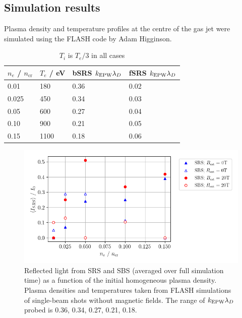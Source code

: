 \subsection{Simulation results}

Plasma density and temperature profiles at the centre of the gas jet were simulated using the FLASH code by Adam Higginson. 

\begin{table}[h]
\begin{center}

\begin{tabular}{|l|l|l|l|}
\hline
$n_e$ / $n_{\mathrm{cr}}$ & $T_e$ / eV & bSRS $k_\mathrm{EPW}\lambda_D$ & fSRS $k_\mathrm{EPW}\lambda_D$\\ \hline \hline
0.01 & 180 & 0.36 & 0.02 \\ \hline
0.025& 450 & 0.34 & 0.03 \\ \hline
0.05 & 600 & 0.27 & 0.04 \\ \hline
0.10 & 900 & 0.21 &  0.05\\ \hline
0.15 & 1100 & 0.18 & 0.06 \\ \hline

\end{tabular}

\end{center}
\caption{$T_i$ is $T_e/3$ in all cases}
\label{tab:LULI_setup}
\end{table}


\begin{figure}[ht]
   \centering
    \includegraphics[width=\columnwidth]{Chapters/C6_magSRS/LULI_sims_v3.png}
    \caption{Reflected light from SRS and SBS (averaged over full simulation time) as a function of the initial homogeneous plasma density. Plasma densities and temperatures taken from FLASH simulations of single-beam shots without magnetic fields. The range of $k_\mathrm{EPW}\lambda_D$ probed is 0.36, 0.34, 0.27, 0.21, 0.18.}
    \label{fig:LULI_sims_v3}
\end{figure}{}



